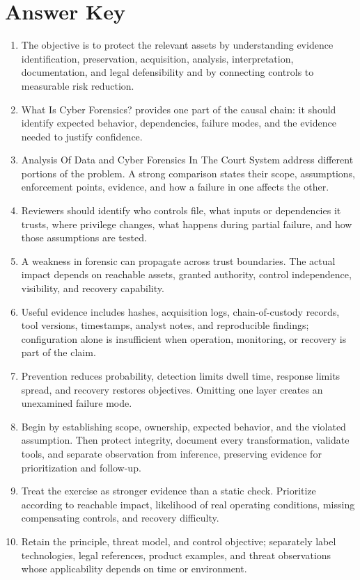 \documentclass[11pt,letterpaper]{article}
\begin{document}
\section*{Answer Key}
\begin{enumerate}
\item The objective is to protect the relevant assets by understanding evidence identification, preservation, acquisition, analysis, interpretation, documentation, and legal defensibility and by connecting controls to measurable risk reduction.
\item What Is Cyber Forensics? provides one part of the causal chain: it should identify expected behavior, dependencies, failure modes, and the evidence needed to justify confidence.
\item Analysis Of Data and Cyber Forensics In The Court System address different portions of the problem. A strong comparison states their scope, assumptions, enforcement points, evidence, and how a failure in one affects the other.
\item Reviewers should identify who controls file, what inputs or dependencies it trusts, where privilege changes, what happens during partial failure, and how those assumptions are tested.
\item A weakness in forensic can propagate across trust boundaries. The actual impact depends on reachable assets, granted authority, control independence, visibility, and recovery capability.
\item Useful evidence includes hashes, acquisition logs, chain-of-custody records, tool versions, timestamps, analyst notes, and reproducible findings; configuration alone is insufficient when operation, monitoring, or recovery is part of the claim.
\item Prevention reduces probability, detection limits dwell time, response limits spread, and recovery restores objectives. Omitting one layer creates an unexamined failure mode.
\item Begin by establishing scope, ownership, expected behavior, and the violated assumption. Then protect integrity, document every transformation, validate tools, and separate observation from inference, preserving evidence for prioritization and follow-up.
\item Treat the exercise as stronger evidence than a static check. Prioritize according to reachable impact, likelihood of real operating conditions, missing compensating controls, and recovery difficulty.
\item Retain the principle, threat model, and control objective; separately label technologies, legal references, product examples, and threat observations whose applicability depends on time or environment.
\end{enumerate}
\end{document}
